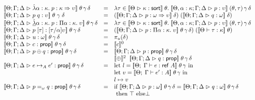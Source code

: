 \begin{figure}
\begin{displaymath}
\begin{array}{lcl}
\interp{\judgeA{\pfun{\alpha}{\kappa}{p}}{\kappa \To \upsilon}}\;\theta\,\gamma\,\delta & = & 
   \semfun{\tau \in \interp{\judgeSort{\kappa}}\;\theta}
          {\interp{\judgeA[\Theta, \alpha:\kappa;\Gamma;\Delta]{p}{\upsilon}}\;(\theta,\tau)\,\gamma\,\delta} \\

\interp{\judgeA{p\;q}{\upsilon}}\;\theta\;\gamma\;\delta & = & 
   (\interp{\judgeA{p}{\omega \To \upsilon}}\;\delta)\;(\interp{\judgeA{q}{\omega}}\;\delta) \\

\interp{\judgeA{\pfunall{\alpha}{\kappa}{p}}{\forallsort{\alpha}{\kappa}{\upsilon}}}\;\theta\,\gamma\,\delta & = &
   \semfun{\tau \in \interp{\judgeSort{\kappa}}\;\theta}
          {\interp{\judgeA[\Theta, \alpha:\kappa; \Gamma; \Delta]{p}{\upsilon}}\;(\theta,\tau)\,\gamma\,\delta}
\\
\interp{\judgeA{p\;[\tau]}{[\tau/\alpha]\upsilon}}\;\theta\,\gamma\,\delta & = & 
   (\interp{\judgeA{p}{\forallsort{\alpha}{\kappa}{\upsilon}}}\;\theta\,\gamma\,\delta)\;
   (\interp{\judgeWK{\tau}{\kappa}}\;\theta) \\


\interp{\judgeA{u}{\omega}}\;\theta\,\gamma\,\delta & = & \pi_u(\delta) \\

\interp{\judgeA{c}{\assert}}\;\theta\,\gamma\,\delta & = & \interp{c}^0 \\

\interp{\judgeA{p \oplus q}{\assert}}\;\theta\,\gamma\,\delta & = & 
    \interp{\judgeA{p}{\assert}}\;\theta\,\gamma\,\delta \\
& & \interp{\oplus}^2\;\;\interp{\judgeA{q}{\assert}}\;\theta\,\gamma\,\delta \\

\interp{\judgeA{e \pointsto_A e'}{\assert}}\;\theta\,\gamma\,\delta & = & 
    \mbox{let } l = \interp{\judgeE{\Gamma}{e}{\reftype{A}}}\;\theta\,\gamma \mbox{ in}\\
& & \mbox{let } v = \interp{\judgeE{\Gamma}{e'}{A}}\;\theta\,\gamma \mbox{ in} \\
& & l \pointsto v \\


\interp{\judgeA{p =_\omega q}{\assert}}\;\theta\,\gamma\,\delta & = & 
   \mbox{if }\interp{\judgeA{p}{\omega}}\;\theta\,\gamma\,\delta = \interp{\judgeA{q}{\omega}}\;\theta\,\gamma\,\delta \\
   & & \mbox{ then } \top \mbox{ else} \bot \\


\end{array}
\end{displaymath}
\end{figure}
